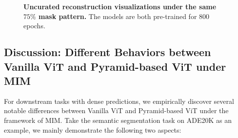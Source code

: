 \documentclass{article}
\begin{document}
\begin{figure}[t]
	\vspace{0pt}
	\begin{center}
		\setlength{\fboxrule}{0pt}
	\end{center}	
	\vspace{-15pt}
	\caption{\textbf{Uncurated reconstruction visualizations under the same $75\%$ mask pattern.} The models are both pre-trained for 800 epochs.
	}
	\label{fig_visual_reconstruction_cropped}
	\vspace{-7pt}
\end{figure}


\subsection{Discussion: Different Behaviors between Vanilla ViT and Pyramid-based ViT under MIM} 
For downstream tasks with dense predictions, we empirically discover several notable differences between Vanilla ViT and Pyramid-based ViT under the framework of MIM. Take the semantic segmentation task on ADE20K as an example, we mainly demonstrate the following two aspects:
\end{document}
